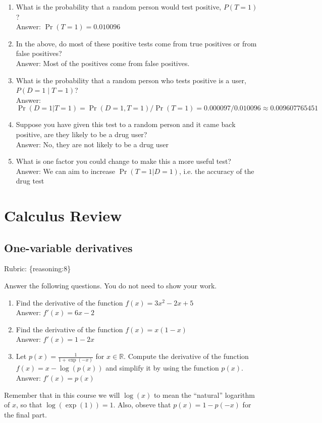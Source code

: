 \documentclass{article}
\def\rubric#1{\gre{Rubric: \{#1\}}}{}
\def\blu#1{{\color{blu}#1}}
\def\gre#1{{\color{gre}#1}}
\def\R{\mathbb{R}}
\def\ans#1{\gre{Answer: #1}}{}
\begin{document}
\begin{enumerate}
\item What is the probability that a random person would test positive, $P(T=1)$?\\
\ans{$\Pr(T = 1) = 0.010096$}
\item In the above, do most of these positive tests come from true positives or from false positives? \\
\ans{Most of the positives come from false positives.}
\item What is the probability that a random person who tests positive is a user, $P(D=1 \mid T=1)$? \\
\ans{$\Pr(D = 1 | T = 1) = \Pr(D = 1, T = 1) / \Pr(T = 1) = 0.000097/0.010096 \approx 0.009607765451$}
\item Suppose you have given this test to a random person and it came back positive, are they likely to be a drug user? \\
\ans{No, they are not likely to be a drug user}
\item What is one factor you could change to make this a more useful test? \\
\ans{We can aim to increase $\Pr(T = 1 | D = 1)$, i.e. the accuracy of the drug test}
\end{enumerate}


\section{Calculus Review}



\subsection{One-variable derivatives}
\label{sub.one.var}
\rubric{reasoning:8}

\blu{Answer the following questions.} You do not need to show your work.

\begin{enumerate}
\item Find the derivative of the function $f(x) = 3x^2 -2x + 5$ \\
\ans{$f'(x) = 6x - 2$}
\item Find the derivative of the function $f(x) = x(1-x)$ \\
\ans{$f'(x) = 1 - 2x$}
\item Let $p(x) = \frac{1}{1+\exp(-x)}$ for $x \in \R$. Compute the derivative of the function $f(x) = x-\log(p(x))$ and simplify it by using the function $p(x)$. \\
\ans{$f'(x) = p(x)$}
\end{enumerate}
Remember that in this course we will $\log(x)$ to mean the ``natural'' logarithm of $x$, so that $\log(\exp(1)) = 1$. Also, obseve that $p(x) = 1-p(-x)$ for the final part.
\end{document}

